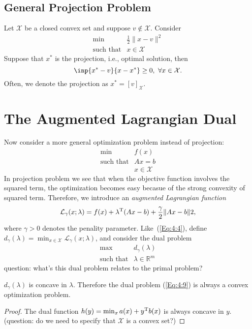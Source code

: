 \subsection{General Projection Problem}
Let $\mathcal{X}$ be a closed convex set and suppose $v\notin\mathcal{X}$. Consider
\begin{equation*}
\begin{array}{ll}
\min&\frac{1}{2}\|x-v\|^2\\
\mbox{such that}&x\in\mathcal{X}
\end{array}
\end{equation*}
Suppose that $x^*$ is the projection, i.e., optimal solution, then
\[
\inp{x^*-v}{x-x^*}\ge0,\ \forall x\in\mathcal{X}.
\]
Often, we denote the projection as $x^*=[v]_{\mathcal{X}}$.

\section{The Augmented Lagrangian Dual}
Now consider a more general optimization problem instead of projection:
\[
\begin{array}{ll}
\min&f(x)\\
\mbox{such that}&Ax=b\\
&x\in\mathcal{X}
\end{array}
\]
In projection problem we see that when the objective function involves the squared term, the optimization becomes easy becasue of the strong convexity of squared term. Therefore, we introduce an \emph{augmented Lagrangian function}
\[
\mathcal{L}_{\gamma}(x;\lambda)=f(x)+\lambda^{\mathrm T}(Ax-b)+\frac{\gamma}{2}\|Ax-b\|2,
\]
where $\gamma>0$ denotes the penality parameter. Like~(\ref{Eq:4:4}), define $d_\gamma(\lambda) = \min_{x\in\mathcal{X}}\mathcal{L}_{\gamma}(x;\lambda)$, and consider the dual problem
\begin{equation}\label{Eq:4:9}
\begin{array}{ll}
\max&d_\gamma(\lambda)\\
\mbox{such that}&\lambda\in\mathbb{R}^m
\end{array}
\end{equation}
question: what's this dual problem relates to the primal problem?

\begin{proposition}[Convexity]
$d_\gamma(\lambda)$ is concave in $\lambda$. Therefore the dual problem (\ref{Eq:4:9}) is always a convex optimization problem.
\end{proposition}
\begin{proof}
The dual function $h(y)=\min_{x}a(x)+y^{\mathrm T} b(x)$ is always concave in $y$. (question: do we need to specify that $\mathcal{X}$ is a convex set?)
\end{proof}

